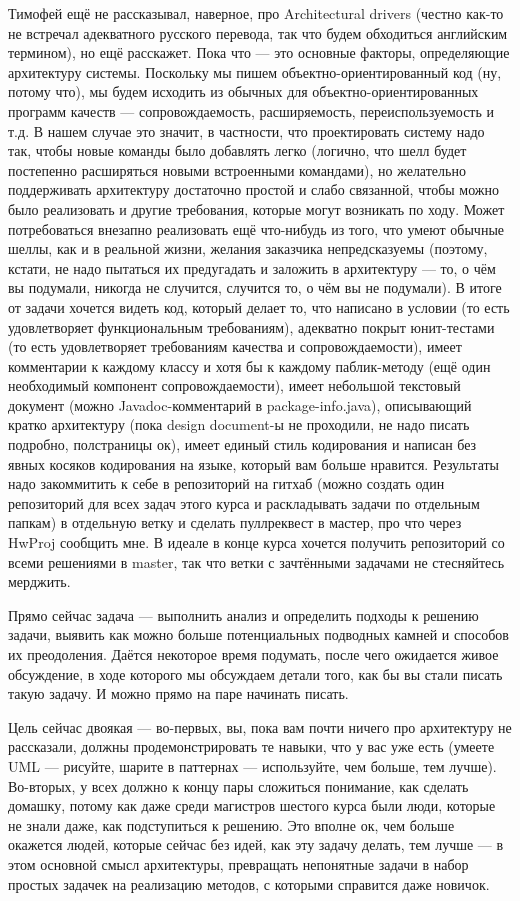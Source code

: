 \documentclass[a5paper]{article}
\begin{document}
Тимофей ещё не рассказывал, наверное, про Architectural drivers (честно как-то не встречал адекватного русского перевода, так что будем обходиться английским термином), но ещё расскажет. Пока что --- это основные факторы, определяющие архитектуру системы. Поскольку мы пишем объектно-ориентированный код (ну, потому что), мы будем исходить из обычных для объектно-ориентированных программ качеств --- сопровождаемость, расширяемость, переиспользуемость и т.д. В нашем случае это значит, в частности, что проектировать систему надо так, чтобы новые команды было добавлять легко (логично, что шелл будет постепенно расширяться новыми встроенными командами), но желательно поддерживать архитектуру достаточно простой и слабо связанной, чтобы можно было реализовать и другие требования, которые могут возникать по ходу. Может потребоваться внезапно реализовать ещё что-нибудь из того, что умеют обычные шеллы, как и в реальной жизни, желания заказчика непредсказуемы (поэтому, кстати, не надо пытаться их предугадать и заложить в архитектуру --- то, о чём вы подумали, никогда не случится, случится то, о чём вы не подумали). В итоге от задачи хочется видеть код, который делает то, что написано в условии (то есть удовлетворяет функциональным требованиям), адекватно покрыт юнит-тестами (то есть удовлетворяет требованиям качества и сопровождаемости), имеет комментарии к каждому классу и хотя бы к каждому паблик-методу (ещё один необходимый компонент сопровождаемости), имеет небольшой текстовый документ (можно Javadoc-комментарий в package-info.java), описывающий кратко архитектуру (пока design document-ы не проходили, не надо писать подробно, полстраницы ок), имеет единый стиль кодирования и написан без явных косяков кодирования на языке, который вам больше нравится. Результаты надо закоммитить к себе в репозиторий на гитхаб (можно создать один репозиторий для всех задач этого курса и раскладывать задачи по отдельным папкам) в отдельную ветку и сделать пуллреквест в мастер, про что через HwProj сообщить мне. В идеале в конце курса хочется получить репозиторий со всеми решениями в master, так что ветки с зачтёнными задачами не стесняйтесь мерджить.

Прямо сейчас задача --- выполнить анализ и определить подходы к решению задачи, выявить как можно больше потенциальных подводных камней и способов их преодоления. Даётся некоторое время подумать, после чего ожидается живое обсуждение, в ходе которого мы обсуждаем детали того, как бы вы стали писать такую задачу. И можно прямо на паре начинать писать.

Цель сейчас двоякая --- во-первых, вы, пока вам почти ничего про архитектуру не рассказали, должны продемонстрировать те навыки, что у вас уже есть (умеете UML --- рисуйте, шарите в паттернах --- используйте, чем больше, тем лучше). Во-вторых, у всех должно к концу пары сложиться понимание, как сделать домашку, потому как даже среди магистров шестого курса были люди, которые не знали даже, как подступиться к решению. Это вполне ок, чем больше окажется людей, которые сейчас без идей, как эту задачу делать, тем лучше --- в этом основной смысл архитектуры, превращать непонятные задачи в набор простых задачек на реализацию методов, с которыми справится даже новичок.
\end{document}
